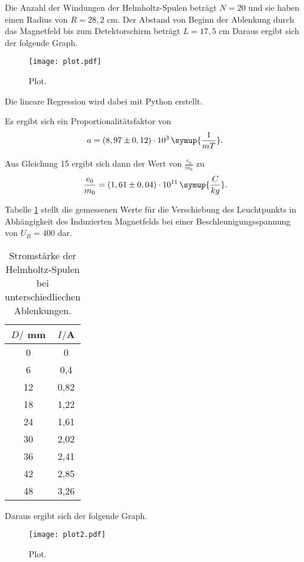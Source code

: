 Die Anzahl der Windungen der Helmholtz-Spulen beträgt $N=20$ und sie haben einen Radius von $R = 28,2$ cm.
Der Abstand von Beginn der Ablenkung durch das Magnetfeld bis zum Detektorschirm beträgt $L = 17,5$ cm
Daraus ergibt sich der folgende Graph.

\begin{figure}[H]
  \centering
  \texttt{[image: plot.pdf]}
  \caption{Plot.}
  \label{fig:plot}
\end{figure}

Die lineare Regression wird dabei mit Python erstellt.

Es ergibt sich ein Proportionalitätsfaktor von
\begin{equation*}
  a = (8,97 \pm 0,12)\cdot 10^3\, \symup{\frac{1}{mT}}.
\end{equation*}

Aus Gleichung 15 ergibt sich dann der Wert von $\frac{e_0}{m_0}$ zu
\begin{equation*}
  \frac{e_0}{m_0} = (1,61 \pm 0,04)\cdot 10^{11} \, \symup{\frac{C}{kg}}.
\end{equation*}



Tabelle \ref{tab:Magnetfeld1} stellt die gemessenen Werte für die Verschiebung des Leuchtpunkts in Abhängigkeit
des Induzierten Magnetfelds bei einer Beschleunigungsspannung von $U_B = 400$ dar.

\begin{table}[H]
  \centering
  \caption{Stromstärke der Helmholtz-Spulen bei unterschiedliechen Ablenkungen.}
  \label{tab:Magnetfeld1}
  \begin{tabular}{c c}
    \toprule
    $D/$ mm & $I/$A \\
    \midrule
    0 & 0 \\
    6 & 0,4 \\
    12 & 0,82 \\
    18 & 1,22 \\
    24 & 1,61 \\
    30 & 2,02 \\
    36 & 2,41 \\
    42 & 2,85 \\
    48 & 3,26 \\
    \bottomrule
  \end{tabular}
\end{table}

Daraus ergibt sich der folgende Graph.

\begin{figure}[H]
  \centering
  \texttt{[image: plot2.pdf]}
  \caption{Plot.}
  \label{fig:plot222}
\end{figure}

